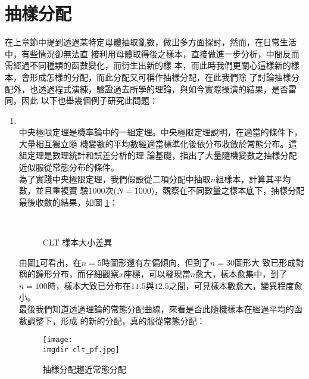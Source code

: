 	\section{抽樣分配}
		在上章節中提到透過某特定母體抽取亂數，做出多方面探討，然而，在日常生活中，有些情況卻無法直			接利用母體取得後之樣本，直接做進一步分析，中間反而需經過不同種類的函數變化，而衍生出新的樣			本，而此時我們更關心這樣新的樣本，會形成怎樣的分配，而此分配又可稱作抽樣分配，在此我們除				了討論抽樣分配外，也透過程式演練，驗證過去所學的理論，與如今實際操演的結果，是否雷同，因此			以下也舉幾個例子研究此問題：
		\begin{enumerate}
			\item{\textbf{}\\
				中央極限定理是機率論中的一組定理。中央極限定理說明，在適當的條件下，大量相互獨立隨					機變數的平均數經適當標準化後依分布收斂於常態分布。這組定理是數理統計和誤差分析的理					論基礎，指出了大量隨機變數之抽樣分配近似服從常態分布的條件。				
				\\
				\bigskip
				為了實踐中央極限定理，我們假設從二項分配中抽取$n$組樣本，計算其平均數，並且重複實					驗1000次($N=1000$)，觀察在不同數量之樣本底下，抽樣分配最後收斂的結果，如圖						\ref{clt_samplesize}：
				\begin{figure}[H]	
		 			 \centering	 			 	 
       				 \\
   			 		 \caption{CLT 樣本大小差異}   		
   			 		 \label{clt_samplesize}   			 		 
				\end{figure}
				由圖\ref{clt_samplesize}可看出，在$n=5$時圖形還有左偏傾向，但到了$n=30$圖形大					致已形成對稱的鐘形分布，而仔細觀察$x$座標，可以發現當$n$愈大，樣本愈集中，到了						$n=100$時，樣本大致已分布在$11.5$與$12.5$之間，可見樣本數愈大，變異程度愈小。
				\\				
				最後我們知道透過理論的常態分配曲線，來看是否此隨機樣本在經過平均的函數調整下，形成					的新的分配，真的服從常態分配：
				\begin{figure}[H]	
		 		 	\centering	 			 	 
   				 	\texttt{[image: \\imgdir clt\_pf.jpg]} 
   			 	 	\caption{抽樣分配趨近常態分配}   		
   			 		\label{clt_pf}   			 		 
				\end{figure}
}
\end{enumerate}
